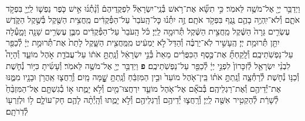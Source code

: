 \documentclass[twoside, openany, parskip=half, 11pt]{book}
\begin{document}
\begin{footnotesize}
\begin{multicols}{2}
\\
וַיְדַבֵּ֥ר יְיָ֖ אֶל־מֹשֶׁ֥ה לֵּאמֹֽר׃ כִּ֣י תִשָּׂ֞א אֶת־רֹ֥אשׁ בְּ֯נֵֽי־יִשְׂרָאֵל֘ לִפְקֻֽדֵיהֶם֒ וְ֯נָ֨תְ֯נ֜וּ אִ֣ישׁ כֹּ֧פֶר נַפְשׁ֛וֹ לַֽיְיָ֖ בִּפְקֹ֣ד אֹתָ֑ם וְ֯לֹא־יִֽהְיֶ֥ה בָהֶ֛ם נֶ֖גֶף בִּפְקֹ֥ד אֹתָֽם׃ זֶ֣ה יִתְּ֯נ֗וּ כׇּל־הָֽעֹבֵר֙ עַל־הַפְּ֯קֻדִ֔ים מַֽחֲצִ֥ית הַשֶּׁ֖קֶל בְּ֯שֶׁ֣קֶל הַקֹּ֑דֶשׁ עֶשְׂרִ֤ים גֵּרָה֙ הַשֶּׁ֔קֶל מַֽחֲצִ֣ית הַשֶּׁ֔קֶל תְּ֯רוּמָ֖ה לַֽיְיָ׃  כֹּ֗ל הָֽעֹבֵר֙ עַל־הַפְּ֯קֻדִ֔ים מִבֶּ֛ן עֶשְׂרִ֥ים שָׁנָ֖ה וָמָ֑עְ֯לָה יִתֵּ֖ן תְּ֯רוּמַ֥ת יְיָ׃ הֶֽעָשִׁ֣יר לֹֽא־יַרְבֶּ֗ה וְ֯הַדַּל֙ לֹ֣א יַמְעִ֔יט מִֽמַּֽחֲצִ֖ית הַשָּׁ֑קֶל לָתֵת֙ אֶת־תְּ֯רוּמַ֣ת יְיָ֔ לְ֯כַפֵּ֖ר עַל־נַפְשֹֽׁתֵיכֶֽם׃ וְ֯לָֽקַחְתָּ֞ אֶת־כֶּ֣סֶף הַכִּפֻּרִ֗ים מֵאֵת֙ בְּ֯נֵ֣י יִשְׂרָאֵ֔ל וְ֯נָֽתַתָּ֣ אֹת֔וֹ עַל־עֲבֹדַ֖ת אֹ֣הֶל מוֹעֵ֑ד וְ֯הָיָה֩ לִבְנֵ֨י יִשְׂרָאֵ֤ל לְ֯זִכָּרוֹן֙ לִפְנֵ֣י יְיָ֔ לְ֯כַפֵּ֖ר עַל־נַפְשֹֽׁתֵיכֶֽם׃ \textbf{פ}
וַיְדַבֵּ֥ר יְיָ֖ אֶל־מֹשֶׁ֥ה לֵּאמֹֽר׃ וְ֯עָשִׂ֜יתָ כִּיּ֥וֹר נְ֯חֹ֛שֶׁת וְ֯כַנּ֥וֹ נְ֯חֹ֖שֶׁת לְ֯רָחְ֯צָ֑ה וְ֯נָֽתַתָּ֣ אֹת֗וֹ בֵּֽין־אֹ֤הֶל מוֹעֵד֙ וּבֵ֣ין הַמִּזְבֵּ֔חַ וְ֯נָֽתַתָּ֥ שׇׇׇׇׇׇׁ֖מָּה מָֽיִם׃ וְ֯רָֽחֲצ֛וּ אַֽהֲרֹ֥ן וּבָנָ֖יו מִמֶּ֑נּוּ אֶת־יְ֯דֵיהֶ֖ם וְ֯אֶת־רַגְלֵיהֶֽם׃ בְּ֯בֹאָ֞ם אֶל־אֹ֧הֶל מוֹעֵ֛ד יִרְחֲצוּ־מַ֖יִם וְ֯לֹ֣א יָמֻ֑תוּ א֣וֹ בְ֯גִשְׁתָּ֤ם אֶל־הַמִּזְבֵּ֨חַ֙ לְ֯שָׁרֵ֔ת לְ֯הַקְטִ֥יר אִשֶּׁ֖ה לַֽיְיָ׃ וְ֯רָֽחֲצ֛וּ יְ֯דֵיהֶ֥ם וְ֯רַגְלֵיהֶ֖ם וְ֯לֹ֣א יָמֻ֑תוּ וְ֯הָֽיְ֯תָ֨ה לָהֶ֧ם חָק־עוֹלָ֛ם ל֥וֹ וּלְזַרְע֖וֹ לְ֯דֹֽרֹתָֽם׃


\end{multicols}
\end{footnotesize}
\end{document}
